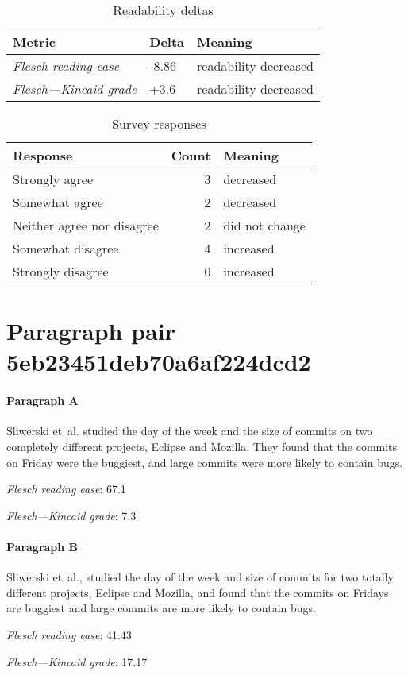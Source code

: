 \bigskip\begin{table}[!h]
\centering
\begin{tabular}{lll}
\toprule
               \textbf{Metric} & \textbf{Delta} &       \textbf{Meaning} \\
\midrule
    \emph{Flesch reading ease} &          -8.86 &  readability decreased \\
 \emph{Flesch---Kincaid grade} &           +3.6 &  readability decreased \\
\bottomrule
\end{tabular}
\caption*{Readability deltas}\end{table}

\begin{table}[!h]
\centering
\begin{tabular}{lrl}
\toprule
          \textbf{Response} &  \textbf{Count} & \textbf{Meaning} \\
\midrule
             Strongly agree &               3 &        decreased \\
             Somewhat agree &               2 &        decreased \\
 Neither agree nor disagree &               2 &   did not change \\
          Somewhat disagree &               4 &        increased \\
          Strongly disagree &               0 &        increased \\
\bottomrule
\end{tabular}
\caption*{Survey responses}\end{table}


\newpage
\section{Paragraph pair 5eb23451deb70a6af224dcd2}
\paragraph{Paragraph A}
Sliwerski et al. studied the day of the week and the size of commits on two completely different projects, Eclipse and Mozilla. They found that the commits on Friday were the buggiest, and large commits were more likely to contain bugs.\par\medskip
\emph{Flesch reading ease}: 67.1\par
\emph{Flesch---Kincaid grade}: 7.3

\paragraph{Paragraph B}
Sliwerski et al., studied the day of the week and size of commits for two totally different projects, Eclipse and Mozilla, and found that the commits on Fridays are buggiest and large commits are more likely to contain bugs.\par\medskip
\emph{Flesch reading ease}: 41.43\par
\emph{Flesch---Kincaid grade}: 17.17

